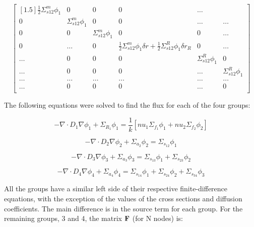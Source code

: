 \documentclass[../main.tex]{subfiles}
\begin{document}
\[
	\begin{bmatrix}[1.5]
		\frac{1}{2} \Sigma^m_{s12} \phi_1  & 0 & 0 & 0 & \dots\\
		0 & \Sigma^m_{s12} \phi_1 & 0 & 0 & \dots & \dots \\
		0 & 0 & \Sigma^m_{s12} \phi_1 & 0 & 0 & \dots\\
		0 & \dots & 0 & \frac{1}{2} \Sigma^m_{s12} \phi_1 \delta r + \frac{1}{2} \Sigma^R_{s12} \phi_1 \delta r_R  & 0 & \dots \\
		\dots & 0 & 0 & 0 & \Sigma^R_{s12} \phi_1 & 0 \\
		\dots & 0 & 0 & 0 & \dots & \Sigma^R_{s12} \phi_1 \\
		\dots & \dots & \dots & \dots & \dots & \dots \\
		\dots & 0 & 0 & 0 & \dots & 0 \\
	\end{bmatrix}
	\]

The following equations were solved to find the flux for each of the four groups:

\begin{equation*}
		- \nabla \cdot D_{1} \nabla \phi_{1}+ \Sigma_{R_1} \phi_1 = \frac{1}{k} [nu_1 \Sigma_{f_1} \phi_{1} + nu_2 \Sigma_{f_2} \phi_{2}] 
	\end{equation*}
	
	\begin{equation*}
		- \nabla \cdot D_{2} \nabla \phi_{2}+ \Sigma_{a_2} \phi_2 = \Sigma_{s_{12}} \phi_1
	\end{equation*}
	
	\begin{equation*}
		- \nabla \cdot D_{3} \nabla \phi_{3}+ \Sigma_{a_3} \phi_3 = \Sigma_{s_{13}} \phi_1 + \Sigma_{s_{23}} \phi_2
	\end{equation*}
	
	\begin{equation*}
		- \nabla \cdot D_{4} \nabla \phi_{4}+ \Sigma_{a_4} \phi_4 = \Sigma_{s_{14}} \phi_1 + \Sigma_{s_{24}} \phi_2 + \Sigma_{s_{34}} \phi_3
	\end{equation*}
	
All the groups have a similar left side of their respective finite-difference equations, with the exception of the values of the cross sections and diffusion coefficients.  The main difference is in the source term for each group.  For the remaining groups, 3 and 4, the matrix $\mathbf{F}$ (for N nodes) is:
\end{document}
